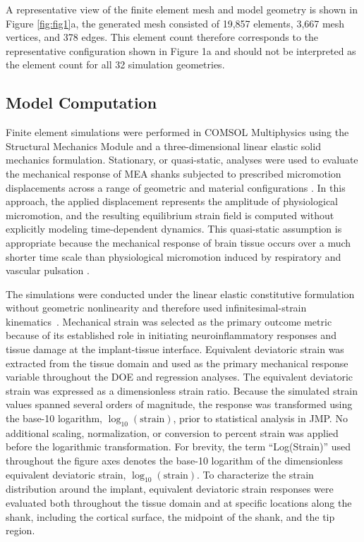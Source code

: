 \documentclass[fleqn,10pt]{wlscirep}
\begin{document}
A representative view of the finite element mesh and model geometry is shown in Figure \ref{fig:fig1}a, the generated mesh consisted of 19,857 elements, 3,667 mesh vertices, and 378 edges. This element count therefore corresponds to the representative configuration shown in Figure 1a and should not be interpreted as the element count for all 32 simulation geometries.



\subsection{Model Computation}

Finite element simulations were performed in COMSOL Multiphysics using the Structural Mechanics Module and a three-dimensional linear elastic solid mechanics formulation. Stationary, or quasi-static, analyses were used to evaluate the mechanical response of MEA shanks subjected to prescribed micromotion displacements across a range of geometric and material configurations \cite{Bathe1996}. In this approach, the applied displacement represents the amplitude of physiological micromotion, and the resulting equilibrium strain field is computed without explicitly modeling time-dependent dynamics. This quasi-static \cite{Andrei2012}assumption is appropriate because the mechanical response of brain tissue occurs over a much shorter time scale than physiological micromotion induced by respiratory and vascular pulsation \cite{Sridharan2013}. 

The simulations were conducted under the linear elastic constitutive formulation without geometric nonlinearity and therefore used infinitesimal-strain kinematics~\cite{Subbaroyan2005,AlAbed2022}. Mechanical strain was selected as the primary outcome metric because of its established role in initiating neuroinflammatory responses and tissue damage at the implant-tissue interface. Equivalent deviatoric strain was extracted from the tissue domain and used as the primary mechanical response variable throughout the DOE and regression analyses. The equivalent deviatoric strain was expressed as a dimensionless strain ratio. Because the simulated strain values spanned several orders of magnitude, the response was transformed using the base-10 logarithm, $\log_{10}(\mathrm{strain})$, prior to statistical analysis in JMP. No additional scaling, normalization, or conversion to percent strain was applied before the logarithmic transformation. For brevity, the term ``Log(Strain)'' used throughout the figure axes denotes the base-10 logarithm of the dimensionless equivalent deviatoric strain, $\log_{10}(\mathrm{strain})$. To characterize the strain distribution around the implant, equivalent deviatoric strain responses were evaluated both throughout the tissue domain and at specific locations along the shank, including the cortical surface, the midpoint of the shank, and the tip region.
\end{document}

